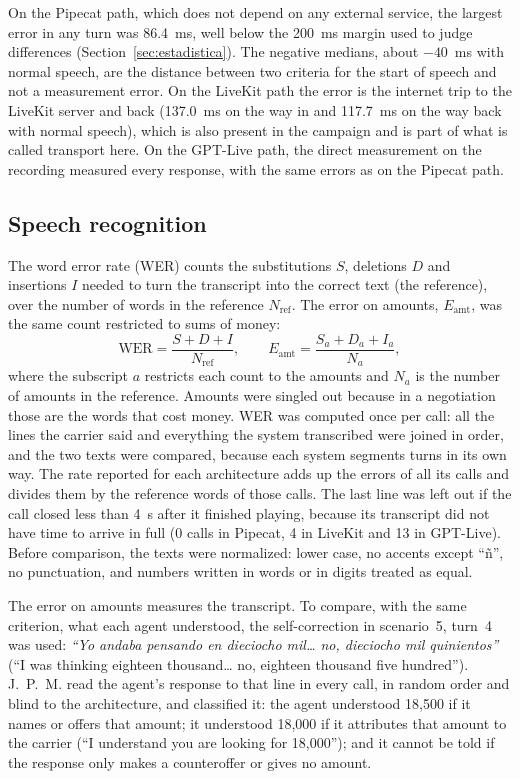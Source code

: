\documentclass[11pt]{article}
\newcommand{\RValBIdaNormal}{137.0}
\newcommand{\RValBVueltaNormal}{117.7}
\newcommand{\RValErrMaxAbs}{86.4}
\newcommand{\RWerFueraA}{0}
\newcommand{\RWerFueraB}{4}
\newcommand{\RWerFueraC}{13}
\begin{document}
On the Pipecat path, which does not depend on any external service, the largest error in
any turn was \RValErrMaxAbs~ms, well below the 200~ms margin used to judge differences
(Section~\ref{sec:estadistica}). The negative medians, about $-40$~ms with normal
speech, are the distance between two criteria for the start of speech and not a
measurement error. On the LiveKit path the error is the internet trip to the LiveKit
server and back (\RValBIdaNormal~ms on the way in and \RValBVueltaNormal~ms on the way
back with normal speech), which is also present in the campaign and is part of what
is called transport here. On the GPT-Live path, the direct measurement on the recording
measured every response, with the same errors as on the Pipecat path.

\FloatBarrier
\subsection{Speech recognition}\label{sec:met-stt}

The word error rate (WER) counts the substitutions $S$, deletions $D$ and insertions
$I$ needed to turn the transcript into the correct text (the reference), over the number of words in the reference $N_{\text{ref}}$. The error on amounts, $E_{\text{amt}}$, was the same count restricted to sums of money:
\begin{equation}
\mathrm{WER}=\frac{S+D+I}{N_{\text{ref}}},\qquad E_{\text{amt}}=\frac{S_{a}+D_{a}+I_{a}}{N_{a}},
\label{eq:wer}
\end{equation}
where the subscript $a$ restricts each count to the amounts and $N_a$ is the number of amounts in the reference. Amounts were singled out because in a negotiation
those are the words that cost money. WER was computed once per call: all the lines the carrier said and everything the system transcribed were joined in order, and the two texts were compared, because each system segments turns in its own way. The rate reported for each architecture adds up the errors of all its calls and divides them by the reference words of those calls. The last line was left out if the call closed less than 4~s after it finished playing, because its
transcript did not have time to arrive in full (\RWerFueraA{} calls in Pipecat,
\RWerFueraB{} in LiveKit and \RWerFueraC{} in GPT-Live). Before comparison, the texts were normalized: lower case, no accents except ``ñ'', no punctuation, and numbers written
in words or in digits treated as equal.

The error on amounts measures the transcript. To compare, with the same criterion,
what each agent understood, the self-correction in scenario~5, turn~4 was used:
\emph{``Yo andaba pensando en dieciocho mil\ldots{} no, dieciocho mil quinientos''}
(``I was thinking eighteen thousand\ldots{} no, eighteen thousand five hundred'').
J.~P.~M. read the agent's response to that line in every call, in random order and
blind to the architecture, and classified it: the agent understood 18,500 if it names or offers
that amount; it understood 18,000 if it attributes that amount to the carrier (``I
understand you are looking for 18,000''); and it cannot be told if the response only
makes a counteroffer or gives no amount.
\end{document}
